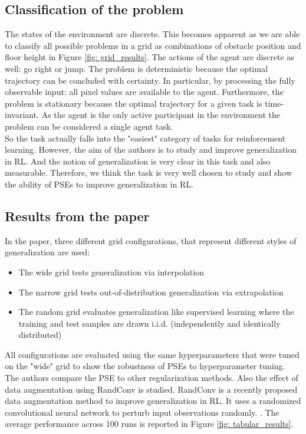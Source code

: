 \documentclass{usiinftr}
\begin{document}
\subsection{Classification of the problem}
The states of the environment are discrete. This becomes apparent as we are able to classify all possible problems in a grid as combinations of obstacle position and floor height in Figure \ref{fig: grid_results}.
The actions of the agent are discrete as well: go right or jump.
The problem is deterministic because the optimal trajectory can be concluded with certainty.
In particular, by processing the fully observable input: all pixel values are available to the agent.
Furthermore, the problem is stationary because the optimal trajectory for a given task is time-invariant.
As the agent is the only active participant in the environment the problem can be considered a single agent task.
\\
So the task actually falls into the "easiest" category of tasks for reinforcement learning. However, the aim of the authors is to study and improve generalization in RL. And the notion of generalization is very clear in this task and also measurable. Therefore, we think the task is very well chosen to study and show the ability of PSEs to improve generalization in RL.
\subsection{Results from the paper}
In the paper, three different grid configurations, that represent different styles of generalization are used:
\begin{itemize}
\item The wide grid tests generalization via interpolation
\item The narrow grid tests out-of-distribution generalization via extrapolation
\item The random grid evaluates generalization like supervised learning where the training and test samples are drawn i.i.d. (independently and identically distributed) 
\end{itemize}
All configurations are evaluated using the same hyperparameters that were tuned on the "wide" grid to show the robustness of PSEs to hyperparameter tuning. The authors compare the PSE to other regularization methods. Also the effect of data augmentation using RandConv is studied. RandConv is a recently proposed data augmentation method to improve generalization in RL. It uses a randomized convolutional neural network to perturb input observations randomly. \cite{lee2020network}. The average performance across 100 runs is reported in Figure \ref{fig: tabular_results}. 
\end{document}
